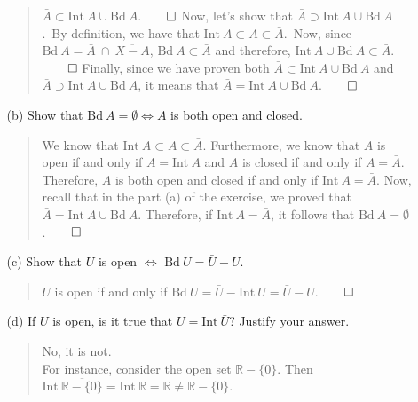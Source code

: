 \documentclass[12pt, a4paper]{article}
\newcommand{\reals}{\mathbb{R}} %
\begin{document}
\begin{itemize}
\begin{itemize}
\begin{quote}
$\bar{A} \subset \mbox{Int} \ A \cup \mbox{Bd} \ A$.$\qed$
\newline
\newline
Now, let's show that $\bar{A} \supset \mbox{Int} \ A \cup \mbox{Bd} \ A$.\
By definition, we have that $\mbox{Int} \ A \subset A \subset \bar{A}$.\
Now, since $\mbox{Bd} \ A = \bar{A} \ \cap \ \overline{X - A}$, $\mbox{Bd} \ A \subset \bar{A}$
and therefore, $\mbox{Int} \ A \cup \mbox{Bd} \ A \subset \bar{A}$.$\qed$
\newline
\newline
Finally, since we have proven both $\bar{A} \subset \mbox{Int} \ A \cup \mbox{Bd} \ A$
and $\bar{A} \supset \mbox{Int} \ A \cup \mbox{Bd} \ A$, it means that $\bar{A} = \mbox{Int} \ A \cup \mbox{Bd} \ A$.$\qed$
\end{quote}

\item[]
\item[]

\item[(b)]
Show that $\mbox{Bd} \ A = \emptyset \Leftrightarrow A$ is both open and closed.
\begin{quote}
We know that $\mbox{Int} \ A \subset A \subset \bar{A}$.
Furthermore, we know that $A$ is open if and only if
$A = \mbox{Int} \ A$ and $A$ is closed if and only if
$A = \bar{A}$. Therefore, $A$ is both open and closed
if and only if $\mbox{Int} \ A = \bar{A}$. Now, recall
that in the part (a) of the exercise, we proved that $\bar{A} = \mbox{Int} \ A \cup \mbox{Bd} \ A$.
Therefore, if $\mbox{Int} \ A = \bar{A}$, it follows that $\mbox{Bd} \ A = \emptyset$.$\qed$
\end{quote}

\item[]
\item[]

\item[(c)]
Show that $U$ is open $\Leftrightarrow$ $\mbox{Bd} \ U = \bar{U} - U$.
\begin{quote}
$U$ is open if and only if $\mbox{Bd} \ U = \bar{U} - \mbox{Int} \ U = \bar{U} - U$.$\qed$
\end{quote}

\item[]
\item[]

\item[(d)]
If $U$ is open, is it true that $U = \mbox{Int} \ \bar{U}$? Justify your answer.\
\begin{quote}
No, it is not.\\
For instance, consider the open set $\reals - \{0\}$.
Then $\mbox{Int} \ \overline{\reals - \{0\}} = \mbox{Int} \ \reals = \reals \neq \reals - \{0\}$.
\end{quote}
\end{itemize}


\end{itemize}
\end{document}
